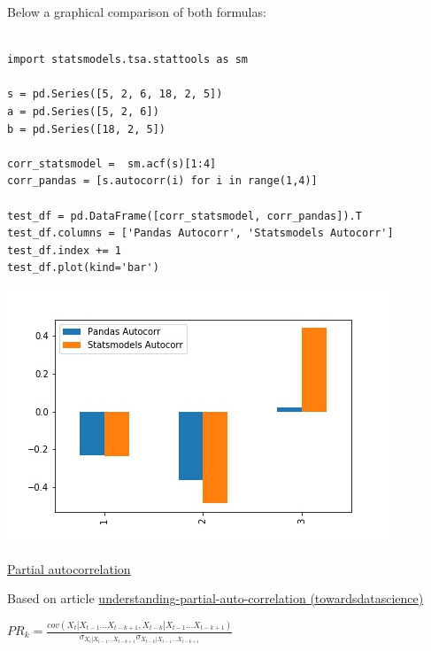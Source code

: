 Below a graphical comparison of both formulas:

\lstset{language=Python}
\lstset{frame=lines}
\lstset{basicstyle=\footnotesize}
\begin{lstlisting}

import statsmodels.tsa.stattools as sm

s = pd.Series([5, 2, 6, 18, 2, 5])
a = pd.Series([5, 2, 6])
b = pd.Series([18, 2, 5])

corr_statsmodel =  sm.acf(s)[1:4]
corr_pandas = [s.autocorr(i) for i in range(1,4)]

test_df = pd.DataFrame([corr_statsmodel, corr_pandas]).T
test_df.columns = ['Pandas Autocorr', 'Statsmodels Autocorr']
test_df.index += 1
test_df.plot(kind='bar')

\end{lstlisting}

\begin{center}
\includegraphics[scale=0.6]{corr_comparison.jpg}
\end{center}

\vspace{5mm}

\underline{Partial autocorrelation}

\vspace{5mm}

Based on article \href{https://towardsdatascience.com/understanding-partial-auto-correlation-fa39271146ac}{understanding-partial-auto-correlation (towardsdatascience)}

\vspace{5mm}

\begin{center}
$PR_k = \frac{cov(X_t | X_{t-1} ... X_{t-k+1},X_{t-k} | X_{t-1} ... X_{t-k+1})}{\sigma_{X_t | X_{t-1} ... X_{t-k+1}} \sigma_{X_{t-k} | X_{t-1} ... X_{t-k+1}}}$
\end{center}

